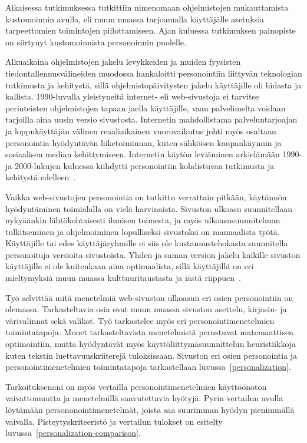 \documentclass[finnish, 12pt, a4paper, elec, utf8, a-1b, online]{aaltothesis}
\begin{document}
Aikaisessa tutkimuksessa tutkittiin nimenomaan ohjelmistojen mukauttamista
kustomoinnin avulla, eli muun muassa tarjoamalla käyttäjälle asetuksia
tarpeettomien toimintojen piilottamiseen. Ajan kuluessa tutkimuksen painopiste
on siirtynyt kustomoinnista personoinnin puolelle.

Alkuaikoina ohjelmistojen jakelu levykkeiden ja muiden fyysisten
tiedontallennusvälineiden muodossa hankaloitti personointiin liittyvän
teknologian tutkimusta ja kehitystä, sillä ohjelmistopäivitysten jakelu
käyttäjille oli hidasta ja kallista. 1990-luvulla yleistyneitä internet- eli
web-sivustoja ei tarvitse perinteisten ohjelmistojen tapaan jaella käyttäjille,
vaan palvelimelta voidaan tarjoilla aina uusin versio sivustosta. Internetin
mahdollistama palveluntarjoajan ja loppukäyttäjän välinen reaaliaikainen
vuorovaikutus johti myös osaltaan personointia hyödyntävän liiketoiminnan, kuten
sähköisen kaupankäynnin ja sosiaalisen median kehittymiseen. Internetin käytön
leviäminen arkielämään 1990- ja 2000-lukujen kuluessa kiihdytti personointiin
kohdistuvaa tutkimusta ja kehitystä edelleen~\cite{10.1108/03090560710737534}.

Vaikka web-sivustojen personointia on tutkittu verrattain pitkään, käytännön
hyödyntäminen toimialalla on vielä harvinaista. Sivuston ulkoasu suunnitellaan
nykyäänkin lähtökohtaisesti ihmisen toimesta, ja myös ulkoasusuunnitelman
tulkitseminen ja ohjelmoiminen lopulliseksi sivustoksi on manuaalista työtä.
Käyttäjille tai edes käyttäjäryhmille ei siis ole kustannustehokasta suunnitella
personoituja versioita sivustoista. Yhden ja saman version jakelu kaikille
sivuston käyttäjille ei ole kuitenkaan aina optimaalista, sillä käyttäjillä on
eri mieltymyksiä muun muassa kulttuuritaustasta ja iästä
riippuen~\cite{10.1145/2556288.2557052}.

Työ selvittää mitä menetelmiä web-sivuston ulkoasun eri osien personointiin on
olemassa. Tarkasteltavia osia ovat muun muassa sivuston asettelu, kirjasin- ja
värivalinnat sekä valikot. Työ tarkastelee myös eri personointimenetelmien
toimintatapoja. Monet tarkasteltavista menetelmistä perustuvat matemaattisen
optimointiin, mutta hyödyntävät myös käyttöliittymäsuunnittelun heuristiikkoja
kuten tekstin luettavuuskriiterejä tuloksissaan. Sivuston eri osien personointia
ja personointimenetelmien toimintatapoja tarkastellaan
luvussa~\ref{personalization}.

Tarkoituksenani on myös vertailla personointimenetelmien käyttöönoton
vaivattomuutta ja menetelmillä saavutettavia hyötyjä. Pyrin vertailun avulla
löytämään persononointimenetelmät, joista saa suurimman hyödyn pienimmällä
vaivalla. Pisteytyskriteeristö ja vertailun tulokset on esitelty
luvussa~\ref{personalization-comparison}.
\end{document}
